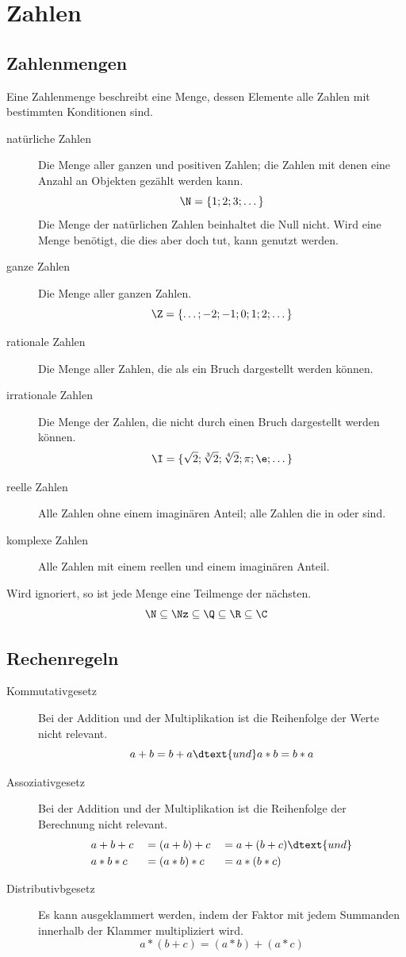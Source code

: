 \documentclass{article}
\begin{document}
\section{Zahlen}
\subsection{Zahlenmengen}
Eine Zahlenmenge beschreibt eine Menge, dessen Elemente alle Zahlen mit bestimmten Konditionen sind.
\begin{description}
 \item[natürliche Zahlen \tN] Die Menge aller ganzen und positiven Zahlen; die Zahlen mit denen \zb eine Anzahl an Objekten gezählt werden kann.
\[
 \N = \{1; 2; 3; \dots\}
\]
Die Menge der natürlichen Zahlen beinhaltet die Null nicht. Wird eine Menge benötigt, die dies aber doch tut, kann \tNz genutzt werden.
 \item[ganze Zahlen \tZ] Die Menge aller ganzen Zahlen.
\[
 \Z = \{\dots; -2; -1; 0; 1; 2; \dots\}
\]
 \item[rationale Zahlen \tQ] Die Menge aller Zahlen, die als ein Bruch dargestellt werden können.
 \item[irrationale Zahlen \tI] Die Menge der Zahlen, die nicht durch einen Bruch dargestellt werden können.
\[
 \I = \{\sqrt{2}; \sqrt[3]{2}; \sqrt[4]{2}; \pi; \e; \dots\}
\]
 \item[reelle Zahlen \tR] Alle Zahlen ohne einem imaginären Anteil; alle Zahlen die in \tQ oder \tI sind.
 \item[komplexe Zahlen \tC] Alle Zahlen mit einem reellen und einem imaginären Anteil.
\end{description} 
Wird \tI ignoriert, so ist jede Menge eine Teilmenge der nächsten.
\[
 \N \subseteq \Nz \subseteq \Q \subseteq \R \subseteq \C
\]

\subsection{Rechenregeln}
\begin{description}
 \item[Kommutativgesetz] Bei der Addition und der Multiplikation ist die Reihenfolge der Werte nicht relevant.
\[
 a+b=b+a \dtext{und} a*b=b*a
\]
 \item[Assoziativgesetz] Bei der Addition und der Multiplikation ist die Reihenfolge der Berechnung nicht relevant.
\begin{alignat*}{3}
 &a+b+c &&= (a+b)+c &&= a+(b+c) \dtext{und} \\
 &a*b*c &&= (a*b)*c &&= a*(b*c)
\end{alignat*}
 \item[Distributivbgesetz] Es kann ausgeklammert werden, indem der Faktor mit jedem Summanden innerhalb der Klammer multipliziert wird.
\[
 a*(b+c) = (a*b)+(a*c)
\]
\end{description}
\end{document}
